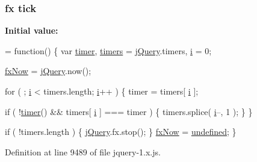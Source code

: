 \subsubsection[{\texorpdfstring{tick}{tick}}]{ {\bf fx} tick}\hypertarget{jquery-1_8x_8js_a4820e1fd61053b39dd3bbd8cac9f48ba}{}\label{jquery-1_8x_8js_a4820e1fd61053b39dd3bbd8cac9f48ba}
{\bfseries Initial value\+:}
\begin{DoxyCode}
= \textcolor{keyword}{function}() \{
    var \hyperlink{jquery-1_8x_8js_a2b44b4db680ed005831a801cef9f8bb3}{timer},
        \hyperlink{jquery-1_8x_8js_a90bf6571856437dc2269be68a12c1d5a}{timers} = \hyperlink{jquery-1_8x_8js_a2b1d6f9c448e3ce72f4e1865d6e38d2c}{jQuery}.timers,
        \hyperlink{respond_8min_8js_a5e25b1d1bed9ab5f3174b76d6a722180}{i} = 0;

    \hyperlink{jquery-1_8x_8js_a008b3271e2f410e89917bc6d96096296}{fxNow} = \hyperlink{jquery-1_8x_8js_a2b1d6f9c448e3ce72f4e1865d6e38d2c}{jQuery}.now();

    \textcolor{keywordflow}{for} ( ; \hyperlink{respond_8min_8js_a5e25b1d1bed9ab5f3174b76d6a722180}{i} < timers.length; \hyperlink{respond_8min_8js_a5e25b1d1bed9ab5f3174b76d6a722180}{i}++ ) \{
        timer = timers[ \hyperlink{respond_8min_8js_a5e25b1d1bed9ab5f3174b76d6a722180}{i} ];
        
        \textcolor{keywordflow}{if} ( !\hyperlink{jquery-1_8x_8js_a2b44b4db680ed005831a801cef9f8bb3}{timer}() && timers[ \hyperlink{respond_8min_8js_a5e25b1d1bed9ab5f3174b76d6a722180}{i} ] === timer ) \{
            timers.splice( \hyperlink{respond_8min_8js_a5e25b1d1bed9ab5f3174b76d6a722180}{i}--, 1 );
        \}
    \}

    \textcolor{keywordflow}{if} ( !timers.length ) \{
        \hyperlink{jquery-1_8x_8js_a2b1d6f9c448e3ce72f4e1865d6e38d2c}{jQuery}.fx.stop();
    \}
    \hyperlink{jquery-1_8x_8js_a008b3271e2f410e89917bc6d96096296}{fxNow} = \hyperlink{jquery-1_8x_8js_a08113a236cc18d2a9d5ce27e638012be}{undefined};
\}
\end{DoxyCode}


Definition at line 9489 of file jquery-\/1.\+x.\+js.

